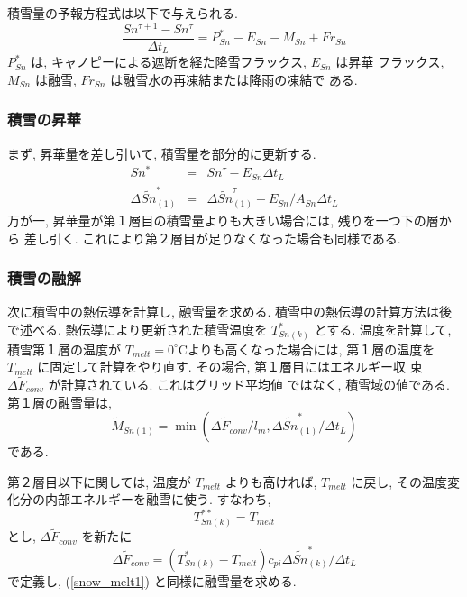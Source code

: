 積雪量の予報方程式は以下で与えられる.
\begin{equation}
 \frac{Sn^{\tau+1}-Sn^{\tau}}{\Delta t_L} = P_{Sn}^* - E_{Sn} - M_{Sn} + Fr_{Sn}
\end{equation}
$P_{Sn}^*$ は, キャノピーによる遮断を経た降雪フラックス, $E_{Sn}$ は昇華
フラックス, $M_{Sn}$ は融雪, $Fr_{Sn}$ は融雪水の再凍結または降雨の凍結で
ある.

\subsubsection{積雪の昇華}

まず, 昇華量を差し引いて, 積雪量を部分的に更新する.
\begin{eqnarray}
 Sn^* &=& Sn^{\tau} - E_{Sn} \Delta t_L \\
 \Delta \widetilde{Sn}_{(1)}^* &=& \Delta \widetilde{Sn}_{(1)}^{\tau} - E_{Sn}/A_{Sn} \Delta t_L
\end{eqnarray}
万が一, 昇華量が第１層目の積雪量よりも大きい場合には, 残りを一つ下の層から
差し引く. これにより第２層目が足りなくなった場合も同様である.

\subsubsection{積雪の融解}

次に積雪中の熱伝導を計算し, 融雪量を求める.
積雪中の熱伝導の計算方法は後で述べる.
熱伝導により更新された積雪温度を $T_{Sn(k)}^*$ とする.
温度を計算して, 積雪第１層の温度が
$T_{melt} = 0^{\circ}$Cよりも高くなった場合には, 第１層の温度を
$T_{melt}$ に固定して計算をやり直す. その場合, 第１層目にはエネルギー収
束 $\Delta \widetilde{F}_{conv}$ が計算されている. これはグリッド平均値
ではなく, 積雪域の値である.
第１層の融雪量は,
\begin{equation}
 \widetilde{M}_{Sn(1)} = \min(\Delta \widetilde{F}_{conv} / l_m, \Delta \widetilde{Sn}_{(1)}^*/\Delta t_L ) \label{snow_melt1}
\end{equation}
である.

第２層目以下に関しては, 温度が $T_{melt}$ よりも高ければ, $T_{melt}$ に戻し,
その温度変化分の内部エネルギーを融雪に使う.
すなわち,
\begin{equation}
 T_{Sn(k)}^{**} = T_{melt}
\end{equation}
とし, $\Delta \widetilde{F}_{conv}$ を新たに
\begin{equation}
 \Delta \widetilde{F}_{conv} = ( T_{Sn(k)}^* - T_{melt} ) c_{pi}\Delta \widetilde{Sn}_{(k)}^*/\Delta t_L
\end{equation}
で定義し, (\ref{snow_melt1}) と同様に融雪量を求める.

